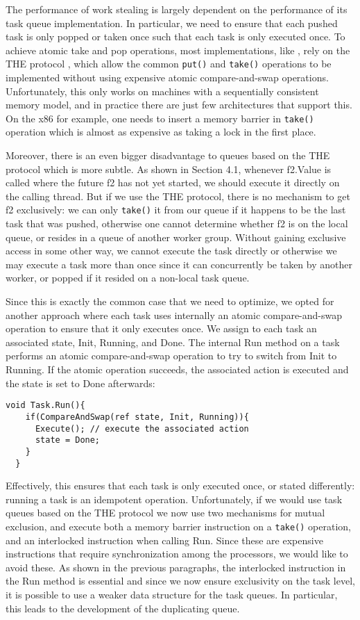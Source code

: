 The performance of work stealing is largely dependent on the
performance of its task queue implementation. In particular, we need
to ensure that each pushed task is only popped or taken once such that
each task is only executed once. To achieve atomic take and pop
operations, most implementations, like \cite{Arora2001}, rely on the
THE protocol \cite{Dijkstra1965}, which allow the common
\lstinline!put()! and \lstinline!take()! operations to be implemented
without using expensive atomic compare-and-swap
operations. Unfortunately, this only works on machines with a
sequentially consistent memory model, and in practice there are just
few architectures that support this. On the x86 for example, one needs
to insert a memory barrier in \lstinline!take()! operation which is
almost as expensive as taking a lock in the first place.

Moreover, there is an even bigger disadvantage to queues based on the
THE protocol which is more subtle. As shown in Section 4.1, whenever
f2.Value is called where the future f2 has not yet started, we should
execute it directly on the calling thread. But if we use the THE
protocol, there is no mechanism to get f2 exclusively: we can only
\lstinline!take()! it from our queue if it happens to be the last task
that was pushed, otherwise one cannot determine whether f2 is on the
local queue, or resides in a queue of another worker group. Without
gaining exclusive access in some other way, we cannot execute the task
directly or otherwise we may execute a task more than once since it
can concurrently be taken by another worker, or popped if it resided
on a non-local task queue.

Since this is exactly the common case that we need to optimize, we
opted for another approach where each task uses internally an atomic
compare-and-swap operation to ensure that it only executes once. We
assign to each task an associated state, Init, Running, and Done. The
internal Run method on a task performs an atomic compare-and-swap
operation to try to switch from Init to Running. If the atomic
operation succeeds, the associated action is executed and the state is
set to Done afterwards:

\begin{lstlisting}[style=Listing]
  void Task.Run(){
    if(CompareAndSwap(ref state, Init, Running)){
      Execute(); // execute the associated action
      state = Done;
    }
  }
\end{lstlisting}

Effectively, this ensures that each task is only executed once, or
stated differently: running a task is an idempotent
operation. Unfortunately, if we would use task queues based on the THE
protocol we now use two mechanisms for mutual exclusion, and execute
both a memory barrier instruction on a \lstinline!take()! operation,
and an interlocked instruction when calling Run. Since these are
expensive instructions that require synchronization among the
processors, we would like to avoid these. As shown in the previous
paragraphs, the interlocked instruction in the Run method is essential
and since we now ensure exclusivity on the task level, it is possible
to use a weaker data structure for the task queues. In particular,
this leads to the development of the duplicating queue.

